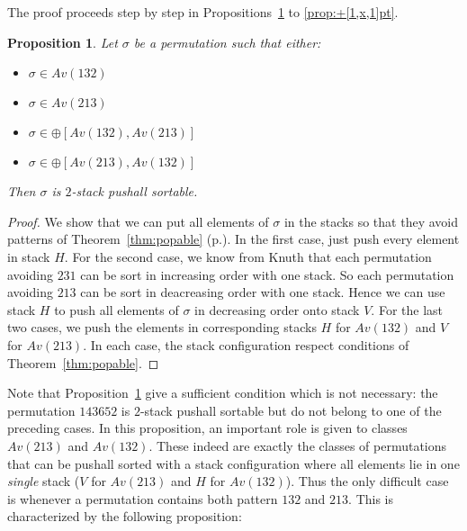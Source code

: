 \documentclass[11pt]{article}
\newtheorem{prop}[thm]{Proposition}
\newcommand{\pushall}{$2$-stack pushall sortable\xspace}
\begin{document}
The proof proceeds step by step in Propositions~\ref{CS} to \ref{prop:+[1,x,1]pt}.

\begin{prop}\label{CS}
Let $\sigma$ be a permutation such that either:
\begin{itemize}
\item $\sigma \in Av(132)$
\item $\sigma \in Av(213)$
\item $\sigma \in \oplus[Av(132),Av(213)]$
\item $\sigma \in \oplus[Av(213),Av(132)]$
\end{itemize}
Then $\sigma$ is \pushall.
\end{prop}
\begin{proof}
We show that we can put all elements of $\sigma$ in the stacks so that they avoid patterns of Theorem~\ref{thm:popable} (p.\pageref{thm:popable}).
In the first case, just push every element in stack $H$. 
For the second case, we know from Knuth \cite{Knuth73} that each permutation avoiding $231$ can be sort in increasing order with one stack. 
So each permutation avoiding $213$ can be sort in deacreasing order with one stack. 
Hence we can use stack $H$ to push all elements of $\sigma$ in decreasing order onto stack $V$. 
For the last two cases, we push the elements in corresponding stacks $H$ for $Av(132)$ and $V$ for $Av(213)$. 
In each case, the stack configuration respect conditions of Theorem~\ref{thm:popable}.
\end{proof}

Note that Proposition~\ref{CS} give a sufficient condition which is not necessary: the permutation $143652$ is \pushall but do not belong to one of the preceding cases. 
In this proposition, an important role is given to classes $Av(213)$ and $Av(132)$. 
These indeed are exactly the classes of permutations that can be pushall sorted with a stack configuration where all elements lie in one {\em single} stack ($V$ for $Av(213)$ and $H$ for $Av(132)$). 
Thus the only difficult case is whenever a permutation contains both pattern $132$ and $213$. 
This is characterized by the following proposition:
\end{document}
